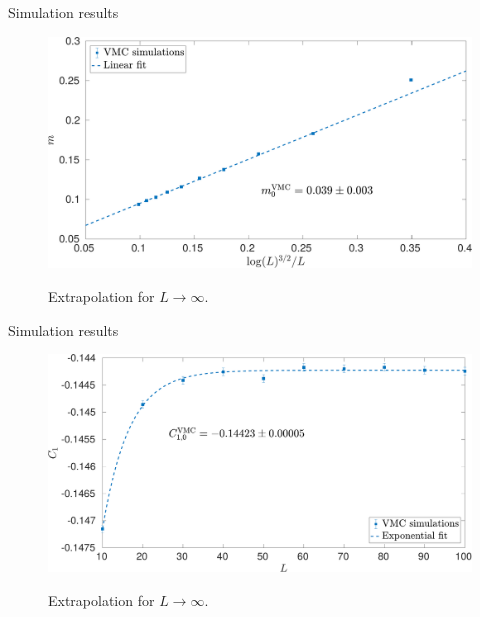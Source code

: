 \documentclass[10pt, compress, protectframetitle, handout]{beamer}
\begin{document}
\begin{frame}{Simulation results}

	\begin{figure}
		\centering
		\includegraphics[width=\textwidth]{m_VMC}
		\label{fig:m_VMC}
		\caption{Extrapolation for $L \to \infty$.}
	\end{figure}
	
\end{frame}

\begin{frame}{Simulation results}

	\begin{figure}
		\centering
		\includegraphics[width=\textwidth]{C1_VMC}
		\label{fig:C1_VMC}
		\caption{Extrapolation for $L \to \infty$.}
	\end{figure}
	
\end{frame}
\end{document}
